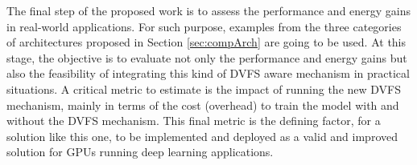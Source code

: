 The final step of the proposed work is to assess the performance and energy gains in real-world applications. For such purpose, examples from the three categories of architectures proposed in Section \ref{sec:compArch} are going to be used. At this stage, the objective is to evaluate not only the performance and energy gains but also the feasibility of integrating this kind of DVFS aware mechanism in practical situations. A critical metric to estimate is the impact of running the new DVFS mechanism, mainly in terms of the cost (overhead) to train the model with and without the DVFS mechanism. This final metric is the defining factor, for a solution like this one, to be implemented and deployed as a valid and improved solution for GPUs running deep learning applications.



